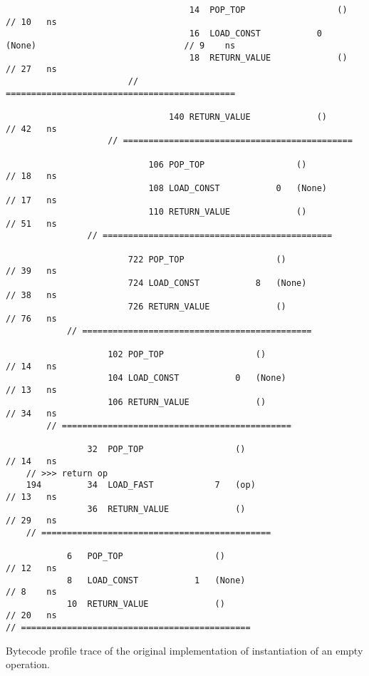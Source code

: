 \begin{code}
\begin{verbatim}
                                    14  POP_TOP                  ()                                 // 10   ns
                                    16  LOAD_CONST           0   (None)                             // 9    ns
                                    18  RETURN_VALUE             ()                                 // 27   ns
                        // =============================================

                                140 RETURN_VALUE             ()                                     // 42   ns
                    // =============================================

                            106 POP_TOP                  ()                                         // 18   ns
                            108 LOAD_CONST           0   (None)                                     // 17   ns
                            110 RETURN_VALUE             ()                                         // 51   ns
                // =============================================

                        722 POP_TOP                  ()                                             // 39   ns
                        724 LOAD_CONST           8   (None)                                         // 38   ns
                        726 RETURN_VALUE             ()                                             // 76   ns
            // =============================================

                    102 POP_TOP                  ()                                                 // 14   ns
                    104 LOAD_CONST           0   (None)                                             // 13   ns
                    106 RETURN_VALUE             ()                                                 // 34   ns
        // =============================================

                32  POP_TOP                  ()                                                     // 14   ns
    // >>> return op
    194         34  LOAD_FAST            7   (op)                                                   // 13   ns
                36  RETURN_VALUE             ()                                                     // 29   ns
    // =============================================

            6   POP_TOP                  ()                                                         // 12   ns
            8   LOAD_CONST           1   (None)                                                     // 8    ns
            10  RETURN_VALUE             ()                                                         // 20   ns
// =============================================
    \end{verbatim}
    \caption{Bytecode profile trace of the original implementation of instantiation of an empty operation.}
    \label{listing:bytecode-profiles-op-build-original}
\end{code}

